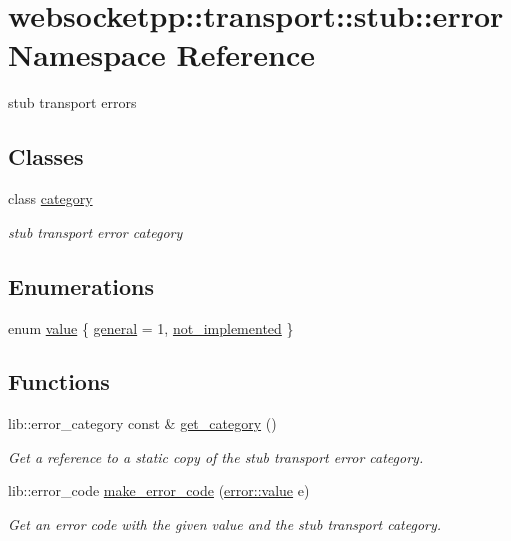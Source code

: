 \hypertarget{namespacewebsocketpp_1_1transport_1_1stub_1_1error}{}\section{websocketpp\+:\+:transport\+:\+:stub\+:\+:error Namespace Reference}
\label{namespacewebsocketpp_1_1transport_1_1stub_1_1error}


stub transport errors  


\subsection*{Classes}
\begin{DoxyCompactItemize}
\item 
class \hyperlink{classwebsocketpp_1_1transport_1_1stub_1_1error_1_1category}{category}
\begin{DoxyCompactList}\small\item\em stub transport error category \end{DoxyCompactList}\end{DoxyCompactItemize}
\subsection*{Enumerations}
\begin{DoxyCompactItemize}
\item 
enum \hyperlink{namespacewebsocketpp_1_1transport_1_1stub_1_1error_abff42d9e608f90864af8d628f6932022}{value} \{ \hyperlink{namespacewebsocketpp_1_1transport_1_1stub_1_1error_abff42d9e608f90864af8d628f6932022a62b9c9a1d537b94775fc8a8db6ff942e}{general} = 1, 
\hyperlink{namespacewebsocketpp_1_1transport_1_1stub_1_1error_abff42d9e608f90864af8d628f6932022ac4e3eebdd5ac574285cde2df484f0aae}{not\+\_\+implemented}
 \}
\end{DoxyCompactItemize}
\subsection*{Functions}
\begin{DoxyCompactItemize}
\item 
lib\+::error\+\_\+category const \& \hyperlink{namespacewebsocketpp_1_1transport_1_1stub_1_1error_aa724815b97c5d35092bfda373b1e7221}{get\+\_\+category} ()
\begin{DoxyCompactList}\small\item\em Get a reference to a static copy of the stub transport error category. \end{DoxyCompactList}\item 
lib\+::error\+\_\+code \hyperlink{namespacewebsocketpp_1_1transport_1_1stub_1_1error_a3d51de99e5f0e3695bd69975e8746b27}{make\+\_\+error\+\_\+code} (\hyperlink{namespacewebsocketpp_1_1transport_1_1stub_1_1error_abff42d9e608f90864af8d628f6932022}{error\+::value} e)
\begin{DoxyCompactList}\small\item\em Get an error code with the given value and the stub transport category. \end{DoxyCompactList}\end{DoxyCompactItemize}


